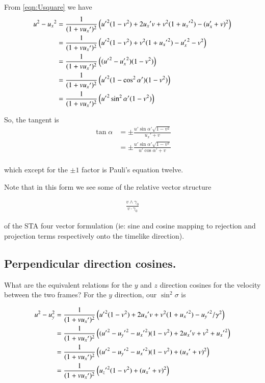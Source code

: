 \documentclass{article}
\begin{document}
From \ref{eqn:Usquare} we have
\begin{align*}
u^2 - {u_x}^2
&= \frac{1}{( 1 + v {u_x}' )^2 } \left(
{{u}'}^2(1-v^2)
+ 2 {u_x}' v
+v^2 (1 + {{u_x}'}^2)
-(u_x' + v)^2
\right) \\
&= \frac{1}{( 1 + v {u_x}' )^2 } \left(
{{u}'}^2(1-v^2)
+v^2 (1 + {{u_x}'}^2)
- {u_x'}^2 
- v^2 
\right) \\
&= \frac{1}{( 1 + v {u_x}' )^2 } \left(
({{u}'}^2 -{u_x'}^2) (1-v^2)
\right) \\
&= \frac{1}{( 1 + v {u_x}' )^2 } \left(
{{u}'}^2(1 -\cos^2\alpha') (1-v^2)
\right) \\
&= \frac{1}{( 1 + v {u_x}' )^2 } \left(
{{u}'}^2 \sin^2\alpha' (1-v^2)
\right) \\
\end{align*}

So, the tangent is
\begin{align*}
\tan\alpha 
&= \pm \frac{ u' \sin\alpha' \sqrt{1-v^2}}{ {u_x}' + v  } \\
&= \pm \frac{ u' \sin\alpha' \sqrt{1-v^2}}{ u'\cos\alpha' + v  } \\
\end{align*}

which except for the $\pm 1$ factor is Pauli's equation twelve.

Note that in this form we see some of the relative vector structure

\begin{align*}
\frac{v \wedge \gamma_0}{v \cdot \gamma_0}
\end{align*}

of the STA four vector formulation (ie: sine and cosine mapping to rejection and projection terms respectively onto the timelike direction).

\subsection{Perpendicular direction cosines. }

What are the equivalent relations for the $y$ and $z$ direction cosines for the velocity between the two frames?  For the $y$ direction, our $\sin^2\sigma$ is

\begin{align*}
u^2 - u_y^2
&=
\frac{1}{( 1 + v {u_x}' )^2 } \left(
{{u}'}^2(1-v^2)
+ 2 {u_x}' v
+v^2 (1 + {{u_x}'}^2)
-{{u_y}'}^2/\gamma^2
\right) \\
&=
\frac{1}{( 1 + v {u_x}' )^2 } \left(
({{u}'}^2 - {{u_y}'}^2 -{{u_x}'}^2)(1-v^2)
+ 2 {u_x}' v
+v^2 
+ {{u_x}'}^2
\right) \\
&=
\frac{1}{( 1 + v {u_x}' )^2 } \left(
({{u}'}^2 - {{u_y}'}^2 -{{u_x}'}^2)(1-v^2)
+ ({u_x}' + v)^2
\right) \\
&=
\frac{1}{( 1 + v {u_x}' )^2 } \left(
{{u_z}'}^2(1-v^2)
+ ({u_x}' + v)^2
\right) \\
\end{align*}
\end{document}

